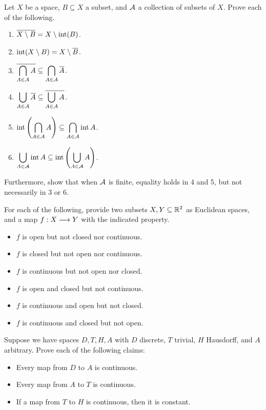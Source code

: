 \newpage
\begin{exr}[source=Primary Source Material]
    Let $ X $ be a space, $ B \subseteq X $ a subset, and $ \mathcal{A} $ a collection
    of subsets of $ X $. Prove each of the following.
    \begin{enumerate}
        \item $ \overline{X \setminus B} = X \setminus \operatorname{int}(B) $.
        \item $ \operatorname{int}(X\setminus B) = X \setminus \overline{B} $.
        \item $ \overline{\displaystyle\bigcap_{A \in \mathcal{A}}A} \subseteq
            \displaystyle\bigcap_{A \in \mathcal{A}} \overline{A} $.
        \item $ \displaystyle\bigcup_{A \in \mathcal{A}} \overline{A} \subseteq
            \overline{\displaystyle\bigcup_{A \in \mathcal{A}}A} $.
        \item $ \operatorname{int}\left(\displaystyle\bigcap_{A \in \mathcal{A}}A\right) \subseteq
            \displaystyle\bigcap_{A \in \mathcal{A}} \operatorname{int} A $.
        \item $ \displaystyle\bigcup_{A \in \mathcal{A}} \operatorname{int} A \subseteq
            \operatorname{int}\left(\displaystyle\bigcup_{A \in \mathcal{A}}A\right) $.
    \end{enumerate}
    Furthermore, show that when $ \mathcal{A} $ is finite, equality holds in 4 and 5,
    but not necessarily in 3 or 6.
\end{exr}

\begin{exr}[source=Primary Source Material]
    For each of the following, provide two subsets $ X, Y \subseteq \mathbb{R}^{2} $ as
    Euclidean spaces, and a map $ f:X\longrightarrow Y $ with the indicated property.
    \begin{itemize}
        \item $ f $ is open but not closed nor continuous.
        \item $ f $ is closed but not open nor continuous.
        \item $ f $ is continuous but not open nor closed.
        \item $ f $ is open and closed but not continuous.
        \item $ f $ is continuous and open but not closed.
        \item $ f $ is continuous and closed but not open.
    \end{itemize}
\end{exr}

\begin{exr}[source=Primary Source Material]
    Suppose we have spaces $ D, T, H, A $ with $ D $ discrete, $ T $ trivial,
    $ H $ Hausdorff, and $ A $ arbitrary. Prove each of the following claims:
    \begin{itemize}
        \item Every map from $ D $ to $ A $ is continuous.
        \item Every map from $ A $ to $ T $ is continuous.
        \item If a map from $ T $ to $ H $ is continuous, then it is constant.
    \end{itemize}
\end{exr}

